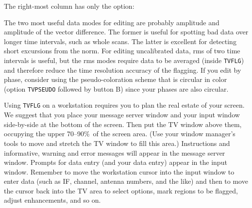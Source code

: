 
     The right-most column has only the option:

     The two most useful data modes for editing are probably amplitude
and amplitude of the vector difference.  The former is useful for
spotting bad data over longer time intervals, such as whole scans.
The latter is excellent for detecting short excursions from the norm.
For editing uncalibrated data, rms of two time intervals is useful,
but the rms modes require data to be averaged (inside {\tt TVFLG}) and
therefore reduce the time resolution accuracy of the flagging.
If you edit by phase, consider using the pseudo-coloration scheme that
is circular in color (option {\tt TVPSEUDO} followed by button B)
since your phases are also circular.

     Using {\tt TVFLG} on a workstation requires you to plan the real
estate of your screen.  We suggest that you place your message server
window and your input window side-by-side at the bottom of the screen.
Then put the TV window above them, occupying the upper 70--90\%\ of
the screen area.  (Use your window manager's tools to move and stretch
the TV window to fill this area.)  Instructions and informative,
warning and error messages will appear in the message server window.
Prompts for data entry (and your data entry) appear in the input
window.  Remember to move the workstation cursor into the input window
to enter data (such as IF, channel, antenna numbers, and the like) and
then to move the cursor back into the TV area to select options, mark
regions to be flagged, adjust enhancements, and so on.

